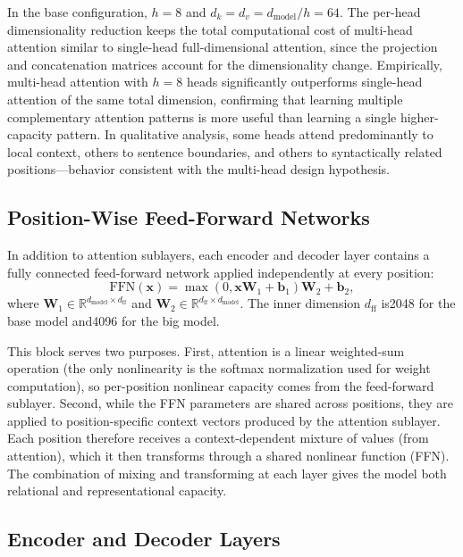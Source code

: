 ﻿\documentclass{article}
\begin{document}
In the base configuration, $h =8$ and $d_k = d_v = d_{\text{model}}/h =64$. The per-head dimensionality reduction keeps the total computational cost of multi-head attention similar to single-head full-dimensional attention, since the projection and concatenation matrices account for the dimensionality change. Empirically, multi-head attention with $h =8$ heads significantly outperforms single-head attention of the same total dimension, confirming that learning multiple complementary attention patterns is more useful than learning a single higher-capacity pattern. In qualitative analysis, some heads attend predominantly to local context, others to sentence boundaries, and others to syntactically related positions---behavior consistent with the multi-head design hypothesis.

\subsection{Position-Wise Feed-Forward Networks}

In addition to attention sublayers, each encoder and decoder layer contains a fully connected feed-forward network applied independently at every position:
\begin{equation}
\text{FFN}(\mathbf{x}) = \max(0, \mathbf{x}\mathbf{W}_1 + \mathbf{b}_1)\mathbf{W}_2 + \mathbf{b}_2,
\label{eq:ffn}
\end{equation}
where $\mathbf{W}_1 \in \mathbb{R}^{d_{\text{model}} \times d_{\text{ff}}}$ and $\mathbf{W}_2 \in \mathbb{R}^{d_{\text{ff}} \times d_{\text{model}}}$. The inner dimension $d_{\text{ff}}$ is2048 for the base model and4096 for the big model.

This block serves two purposes. First, attention is a linear weighted-sum operation (the only nonlinearity is the softmax normalization used for weight computation), so per-position nonlinear capacity comes from the feed-forward sublayer. Second, while the FFN parameters are shared across positions, they are applied to position-specific context vectors produced by the attention sublayer. Each position therefore receives a context-dependent mixture of values (from attention), which it then transforms through a shared nonlinear function (FFN). The combination of mixing and transforming at each layer gives the model both relational and representational capacity.

\subsection{Encoder and Decoder Layers}
\end{document}
